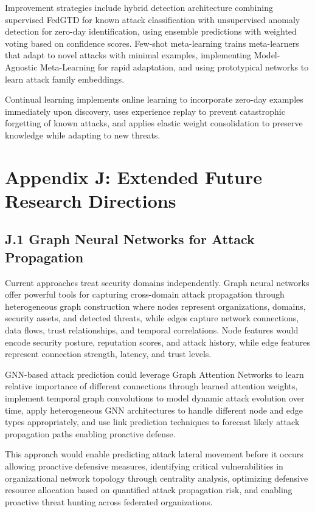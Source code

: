 \documentclass[12pt,a4paper]{article}
\theoremstyle{definition}
\begin{document}
Improvement strategies include hybrid detection architecture combining supervised FedGTD for known attack classification with unsupervised anomaly detection for zero-day identification, using ensemble predictions with weighted voting based on confidence scores. Few-shot meta-learning trains meta-learners that adapt to novel attacks with minimal examples, implementing Model-Agnostic Meta-Learning for rapid adaptation, and using prototypical networks to learn attack family embeddings.

Continual learning implements online learning to incorporate zero-day examples immediately upon discovery, uses experience replay to prevent catastrophic forgetting of known attacks, and applies elastic weight consolidation to preserve knowledge while adapting to new threats.

\section{Appendix J: Extended Future Research Directions}

\subsection{J.1 Graph Neural Networks for Attack Propagation}

Current approaches treat security domains independently. Graph neural networks offer powerful tools for capturing cross-domain attack propagation through heterogeneous graph construction where nodes represent organizations, domains, security assets, and detected threats, while edges capture network connections, data flows, trust relationships, and temporal correlations. Node features would encode security posture, reputation scores, and attack history, while edge features represent connection strength, latency, and trust levels.

GNN-based attack prediction could leverage Graph Attention Networks to learn relative importance of different connections through learned attention weights, implement temporal graph convolutions to model dynamic attack evolution over time, apply heterogeneous GNN architectures to handle different node and edge types appropriately, and use link prediction techniques to forecast likely attack propagation paths enabling proactive defense.

This approach would enable predicting attack lateral movement before it occurs allowing proactive defensive measures, identifying critical vulnerabilities in organizational network topology through centrality analysis, optimizing defensive resource allocation based on quantified attack propagation risk, and enabling proactive threat hunting across federated organizations.
\end{document}
